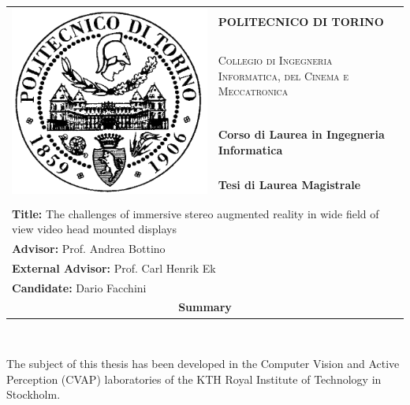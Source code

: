 \documentclass[12pt, a4paper]{article}
\begin{document}
\begin{tabular}{ll}
\multirow{4}{*}{\includegraphics[scale=0.5]{logo.png}} & \textbf{POLITECNICO DI TORINO} \\[0.5em]
& \textsc{Collegio di Ingegneria Informatica, del Cinema e Meccatronica} \\[0.5em]
& \textbf{Corso di Laurea in Ingegneria Informatica} \\[0.5em]
& \textbf{Tesi di Laurea Magistrale} \\[0.7em]
\midrule \\
\multicolumn{2}{p{0.9\linewidth}}{\textbf{Title:} The challenges of immersive stereo augmented reality in wide field of view video head mounted displays} \\[0.5em]
\multicolumn{2}{l}{\textbf{Advisor:} Prof. Andrea Bottino} \\[0.5em]
\multicolumn{2}{l}{\textbf{External Advisor:} Prof. Carl Henrik Ek} \\[0.5em]
\multicolumn{2}{l}{\textbf{Candidate:} Dario Facchini} \\[2em]
\multicolumn{2}{c}{\textbf{\LARGE Summary}}
\end{tabular} \\[1.2em] \par
The subject of this thesis has been developed in the Computer Vision and Active Perception (CVAP) laboratories of the KTH Royal Institute of Technology in Stockholm. \par
\end{document}
